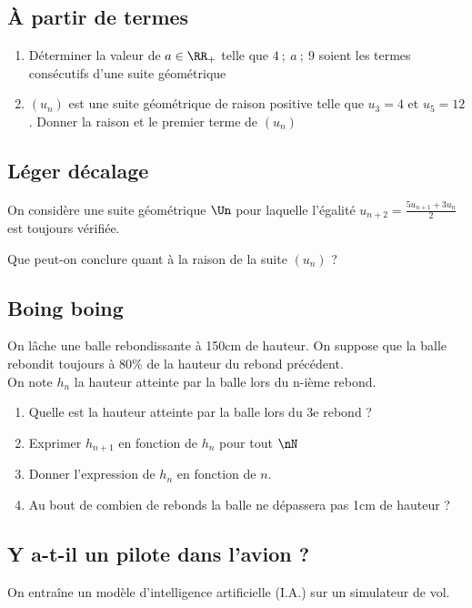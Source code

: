 \documentclass[oneside,12pt]{book}          %
\begin{document}
\subsection{À partir de termes}

\begin{enumerate}
    \item Déterminer la valeur de $a\in\RR_{+}$ telle que $4~;~a~;~9$ soient les termes consécutifs d'une suite géométrique
    \item  $(u_n)$ est une suite géométrique de raison positive telle que $u_{3}=4$ et $u_{5}=12$. Donner la raison et le premier terme de $(u_n)$
\end{enumerate}



\subsection{Léger décalage}

On considère une suite géométrique $\Un$ pour laquelle l'égalité $u_{n+2}=\frac{5u_{n+1}+3u_n}{2}$ est toujours vérifiée.

Que peut-on conclure quant à la raison de la suite $(u_n)$ ?


\subsection{Boing boing}
On lâche une balle rebondissante à 150cm de hauteur. On suppose que la balle rebondit toujours à 80$\%$ de la hauteur du rebond précédent. \\
On note $h_{n}$ la hauteur atteinte par la balle lors du n-ième rebond.

\begin{enumerate}
    \item Quelle est la hauteur atteinte par la balle lors du 3e rebond ?
    \item Exprimer $h_{n+1}$ en fonction de $h_{n}$ pour tout $\nN$
    \item Donner l'expression de $h_{n}$ en fonction de $n$.
    \item[\faCalculator] Au bout de combien de rebonds la balle ne dépassera pas 1cm de hauteur ?
\end{enumerate}



\subsection{Y a-t-il un pilote dans l'avion ?}
On entraîne un modèle d'intelligence artificielle (I.A.) sur un simulateur de vol.
\end{document}
